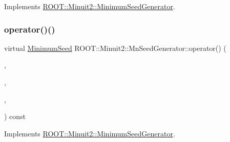 Implements \mbox{\hyperlink{classROOT_1_1Minuit2_1_1MinimumSeedGenerator_ae71de52027d3f0c7fa202c7cf65b947a}{R\+O\+O\+T\+::\+Minuit2\+::\+Minimum\+Seed\+Generator}}.

\mbox{\label{classROOT_1_1Minuit2_1_1MnSeedGenerator_aeba9e3b985e5d74e797cafaffec74de3}} 
\subsubsection{\texorpdfstring{operator()()}{operator()()}\hspace{0.1cm}{\footnotesize\ttfamily [3/4]}}
{\footnotesize\ttfamily virtual \mbox{\hyperlink{classROOT_1_1Minuit2_1_1MinimumSeed}{Minimum\+Seed}} R\+O\+O\+T\+::\+Minuit2\+::\+Mn\+Seed\+Generator\+::operator() (\begin{DoxyParamCaption}\item[{const \mbox{\hyperlink{classROOT_1_1Minuit2_1_1MnFcn}{Mn\+Fcn}} \&}]{,  }\item[{const \mbox{\hyperlink{classROOT_1_1Minuit2_1_1AnalyticalGradientCalculator}{Analytical\+Gradient\+Calculator}} \&}]{,  }\item[{const \mbox{\hyperlink{classROOT_1_1Minuit2_1_1MnUserParameterState}{Mn\+User\+Parameter\+State}} \&}]{,  }\item[{const \mbox{\hyperlink{classROOT_1_1Minuit2_1_1MnStrategy}{Mn\+Strategy}} \&}]{ }\end{DoxyParamCaption}) const\hspace{0.3cm}{\ttfamily [virtual]}}



Implements \mbox{\hyperlink{classROOT_1_1Minuit2_1_1MinimumSeedGenerator_a670b9671c73d7e0d3caa148e82d4b2fa}{R\+O\+O\+T\+::\+Minuit2\+::\+Minimum\+Seed\+Generator}}.

\mbox{\label{classROOT_1_1Minuit2_1_1MnSeedGenerator_a300ecb8a37b30fc5bd13c353f3338a92}} 

